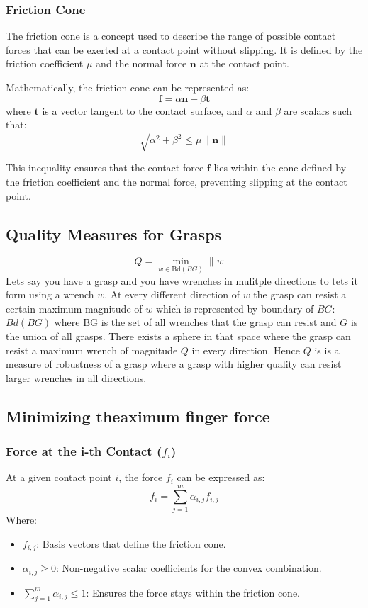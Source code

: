 \documentclass[12pt]{article}
\begin{document}
\subsubsection{Friction Cone}

The friction cone is a concept used to describe the range of possible contact forces that can be exerted at a contact point without slipping. It is defined by the friction coefficient \( \mu \) and the normal force \( \mathbf{n} \) at the contact point.

Mathematically, the friction cone can be represented as:
\[
\mathbf{f} = \alpha \mathbf{n} + \beta \mathbf{t}
\]
where \( \mathbf{t} \) is a vector tangent to the contact surface, and \( \alpha \) and \( \beta \) are scalars such that:
\[
\sqrt{\alpha^2 + \beta^2} \leq \mu \|\mathbf{n}\|
\]

This inequality ensures that the contact force \( \mathbf{f} \) lies within the cone defined by the friction coefficient and the normal force, preventing slipping at the contact point.

\subsection{Quality Measures for Grasps}
\[Q = \min_{w \in \text{Bd}(BG)} \|w\|\]
Lets say you have a grasp and you have wrenches in mulitple directions to tets it form using a wrench \(w\). At every different direction of \(w\) the grasp can resist a certain maximum magnitude of \(w\) which is represented by boundary of \(BG\): \(Bd(BG)\) where BG is the set of all wrenches that the grasp can resist and \(G\) is the union of all grasps.
There exists a sphere in that space where the grasp can resist a maximum wrench of magnitude \(Q\) in every direction. Hence \(Q\) is is a measure of robustness of a grasp where a grasp with higher quality can resist larger wrenches in all directions. 

\subsection{Minimizing theaximum finger force}
\subsubsection{Force at the i-th Contact (\(f_i\))}

At a given contact point \(i\), the force \(f_i\) can be expressed as:
\[
f_i = \sum_{j=1}^{m} \alpha_{i,j} f_{i,j}
\]
Where:
\begin{itemize}
    \item \(f_{i,j}\): Basis vectors that define the friction cone.
    \item \(\alpha_{i,j} \geq 0\): Non-negative scalar coefficients for the convex combination.
    \item \(\sum_{j=1}^{m} \alpha_{i,j} \leq 1\): Ensures the force stays within the friction cone.
\end{itemize}
\end{document}
